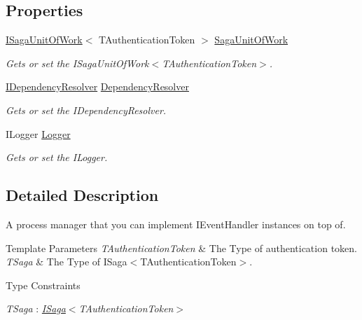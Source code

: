 \subsection*{Properties}
\begin{DoxyCompactItemize}
\item 
\hyperlink{interfaceCqrs_1_1Domain_1_1ISagaUnitOfWork}{I\+Saga\+Unit\+Of\+Work}$<$ T\+Authentication\+Token $>$ \hyperlink{classCqrs_1_1Domain_1_1SagaEventHandler_a4cab45aafb7b71534aae7cbe077d1129_a4cab45aafb7b71534aae7cbe077d1129}{Saga\+Unit\+Of\+Work}
\begin{DoxyCompactList}\small\item\em Gets or set the I\+Saga\+Unit\+Of\+Work$<$\+T\+Authentication\+Token$>$. \end{DoxyCompactList}\item 
\hyperlink{interfaceCqrs_1_1Configuration_1_1IDependencyResolver}{I\+Dependency\+Resolver} \hyperlink{classCqrs_1_1Domain_1_1SagaEventHandler_ad7497b0e19703aa351e571427a072d0d_ad7497b0e19703aa351e571427a072d0d}{Dependency\+Resolver}
\begin{DoxyCompactList}\small\item\em Gets or set the I\+Dependency\+Resolver. \end{DoxyCompactList}\item 
I\+Logger \hyperlink{classCqrs_1_1Domain_1_1SagaEventHandler_a06c2d4b3720bec78e9cea40cb0ed2ff3_a06c2d4b3720bec78e9cea40cb0ed2ff3}{Logger}
\begin{DoxyCompactList}\small\item\em Gets or set the I\+Logger. \end{DoxyCompactList}\end{DoxyCompactItemize}


\subsection{Detailed Description}
A process manager that you can implement I\+Event\+Handler instances on top of. 


\begin{DoxyTemplParams}{Template Parameters}
{\em T\+Authentication\+Token} & The Type of authentication token.\\
\hline
{\em T\+Saga} & The Type of I\+Saga$<$\+T\+Authentication\+Token$>$.\\
\hline
\end{DoxyTemplParams}
\begin{Desc}
\item[Type Constraints]\begin{description}
\item[{\em T\+Saga} : {\em \hyperlink{interfaceCqrs_1_1Domain_1_1ISaga}{I\+Saga}$<$T\+Authentication\+Token$>$}]\end{description}
\end{Desc}


